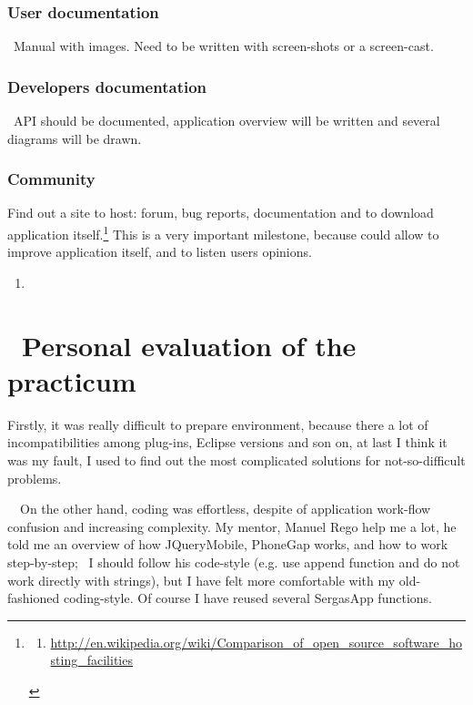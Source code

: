 \documentclass[a4paper]{article}
\begin{document}
\subsubsection[User documentation]{User documentation}
\hypertarget{RefHeading146661801272074}{}\ Manual with images. Need to
be written with screen-shots or a screen-cast.

\subsubsection[Developer{\textquotesingle}s
documentation]{Developer{\textquotesingle}s documentation}
\hypertarget{RefHeading146681801272074}{}\ API should be documented,
application overview will be written and several diagrams will be
drawn.

\clearpage\subsubsection[Community]{Community}
\hypertarget{RefHeading146701801272074}{}Find out a site to host: forum,
bug reports, documentation and to download application
itself.\footnote{\begin{enumerate}
\item[]
\url{http://en.wikipedia.org/wiki/Comparison_of_open_source_software_hosting_facilities}
\end{enumerate}
} This is a very important milestone, because could allow to improve
application itself, and to listen users opinions. \ 

\begin{enumerate}
\item[] 
\bigskip


\bigskip
\end{enumerate}
\section[\ Personal evaluation of the practicum ]{\ Personal evaluation
of the practicum }
\hypertarget{RefHeading114201570052158}{}Firstly, it was really
difficult to prepare environment, because there a lot of
incompatibilities among plug-ins, Eclipse versions and son on, at last
I think it was my fault, I used to find out the most complicated
solutions for not-so-difficult problems. 

\ \ On the other hand, coding was effortless, despite of application
work-flow confusion and increasing complexity. My mentor, Manuel Rego
help me a lot, he told me an overview of how JQueryMobile, PhoneGap
works, and how to work step-by-step; \ I should follow his code-style
(e.g. use append function and do not work directly with strings), but I
have felt more comfortable with my old-fashioned coding-style. Of
course I have reused several SergasApp functions. 
\end{document}
